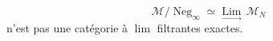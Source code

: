 \[
\mathcal M/\operatorname{Neg}_{\infty}\simeq\underset{\longrightarrow}{\operatorname{Lim}}\,\mathcal M_N
\]
n'est pas une catégorie à \uline{$\operatorname{lim}$} filtrantes exactes.
